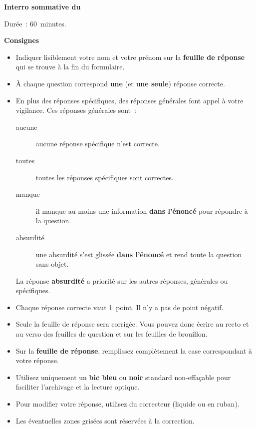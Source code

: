 \documentclass[12pt,french,a4paper,oneside]{article}
\newcommand{\thesubtitle}{Interro sommative du \thedate{}}
\begin{document}
\begin{examcopy}[2]
	\setcounter{figure}{0}
	{\bf \thetitle{} \hfill{} \thesubtitle{}}

	Durée~: 60~minutes.

	\vspace{1em}

	\begin{center}
	\end{center}

	\vspace{1em}

	\textbf{\Large{}Consignes}

	\begin{itemize}
		\item Indiquer lisiblement votre nom et votre prénom sur la \textbf{feuille de réponse} qui se trouve à la fin du formulaire.
		\item À chaque question correspond \textbf{une} (et \textbf{une seule}) réponse correcte.
		\item En plus des réponses spécifiques, des réponses générales font appel à votre vigilance.
		      Ces réponses générales sont~:
		      \begin{description}
			      \item[aucune] aucune réponse spécifique n'est correcte.
			      \item[toutes] toutes les réponses spécifiques sont correctes.
			      \item[manque] il manque au moins une information \textbf{dans l'énoncé} pour répondre à la question.
			      \item[absurdité] une absurdité s'est glissée \textbf{dans l'énoncé} et rend toute la question sans objet.
		      \end{description}
		      La réponse \textbf{absurdité} a priorité sur les autres réponses, générales ou spécifiques.
		\item Chaque réponse correcte vaut 1~point. Il n'y a pas de point négatif.
		\item Seule la feuille de réponse sera corrigée.
		      Vous pouvez donc écrire au recto et au verso des feuilles de question et sur les feuilles de brouillon.
		\item Sur la \textbf{feuille de réponse}, remplissez complètement la case correspondant à votre réponse.
		\item Utilisez uniquement un \textbf{bic bleu} ou \textbf{noir} standard non-effaçable pour faciliter l'archivage et la lecture optique.
		\item Pour modifier votre réponse, utilisez du correcteur (liquide ou en ruban).
		\item Les éventuelles zones grisées sont réservées à la correction.
	\end{itemize}


\end{examcopy}
\end{document}
